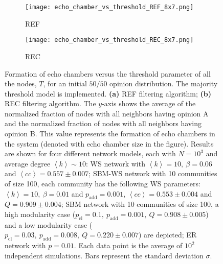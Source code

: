 \documentclass[11 pt , letterpaper , twoside , openright]{book}
\begin{document}
\begin{figure}[H]
  \begin{subfigure}[b]{0.49\textwidth}
    \caption{REF}
  	\texttt{[image: echo\_chamber\_vs\_threshold\_REF\_8x7.png]}
    \label{REF_thres}
  \end{subfigure}
  \begin{subfigure}[b]{0.49\textwidth}
    \caption{REC}
  	\texttt{[image: echo\_chamber\_vs\_threshold\_REC\_8x7.png]}
    \label{REC_thres}
  \end{subfigure}
  \captionsetup{format=plain}
  \caption[Formation of echo chambers versus the threshold parameter of all the nodes, $T$, for the REF and REC filtering algorithms and an initial $50/50$ opinion distribution. The majority threshold model is implemented.]{Formation of echo chambers versus the threshold parameter of all the nodes, $T$, for an initial $50/50$ opinion distribution. The majority threshold model is implemented. \textbf{(a)} REF filtering algorithm; \textbf{(b)} REC filtering algorithm. The $y$-axis shows the average of the normalized fraction of nodes with all neighbors having opinion A and the normalized fraction of nodes with all neighbors having opinion B. This value represents the formation of echo chambers in the system (denoted with echo chamber size in the figure). Results are shown for four different network models, each with $N=10^3$ and average degree $\left<k\right> \sim 10$: WS network with $\left<k\right> =10,\ \beta = 0.06$ and $\left<cc\right> = 0.557 \pm 0.007$; SBM-WS network with 10 communities of size 100, each community has the following WS parameters: $\left<k\right> = 10,\ \beta = 0.01$ and $p_{\text{add}} = 0.001$, $\left<cc\right> = 0.553 \pm 0.004$ and $Q = 0.909 \pm 0.004$; SBM network with 10 communities of size 100, a high modularity case ($p_{\text{cl}} = 0.1,\ p_{\text{add}} = 0.001,\ Q = 0.908 \pm 0.005$) and a low modularity case ($p_{\text{cl}} = 0.03,\ p_{\text{add}} = 0.008,\ Q = 0.220 \pm 0.007$) are depicted; ER network with $p= 0.01$. Each data point is the average of $10^2$ independent simulations. Bars represent the standard deviation $\sigma$.}
\label{echo_vs_threshold_REF-REC}
\end{figure}
\noindent
\end{document}
